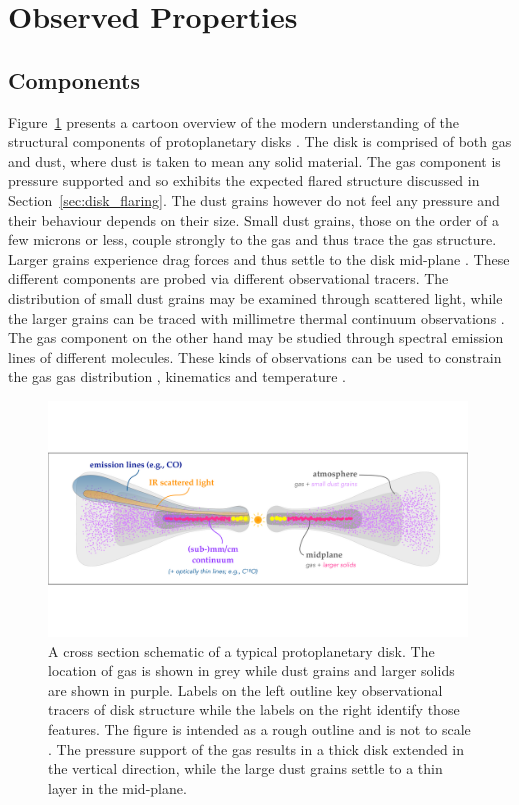 \section{Observed Properties}

\subsection{Components}

Figure~\ref{fig:struct_cartoon} presents a cartoon overview of the modern understanding of the structural components of protoplanetary disks \citep{andrews2020}.
The disk is comprised of both gas and dust, where dust is taken to mean any solid material.
The gas component is pressure supported and so exhibits the expected flared structure discussed in Section~\ref{sec:disk_flaring}.
The dust grains however do not feel any pressure and their behaviour depends on their size.
Small dust grains, those on the order of a few microns or less, couple strongly to the gas and thus trace the gas structure.
Larger grains experience drag forces and thus settle to the disk mid-plane \citep{weidenschilling1977}.
These different components are probed via different observational tracers.
The distribution of small dust grains may be examined through scattered light, while the larger grains can be traced with millimetre thermal continuum observations \citep{almapartnership2015,andrews2016,ansdell2016}. 
The gas component on the other hand may be studied through spectral emission lines of different molecules.
These kinds of observations can be used to constrain the gas gas distribution \citep{vandermarel2015,ansdell2016,zhang2021}, kinematics \citep{perez2015,pinte2018a,teague2018,pinte2019,yu2021,calcino2022} and temperature \citep{pinte2018,calahan2021}.

\begin{figure}
    \centering
    \includegraphics[width = 0.99\textwidth]{figures/cartoon_overview.pdf}
    \caption{A cross section schematic of a typical protoplanetary disk. The location of gas is shown in grey while dust grains and larger solids are shown in purple. Labels on the left outline key observational tracers of disk structure while the labels on the right identify those features. The figure is intended as a rough outline and is not to scale \citep[see review by][]{andrews2020}. The pressure support of the gas results in a thick disk extended in the vertical direction, while the large dust grains settle to a thin layer in the mid-plane.}
    \label{fig:struct_cartoon}
\end{figure}

